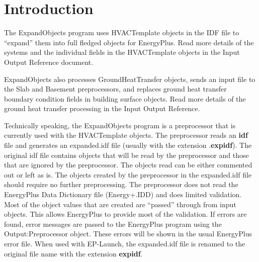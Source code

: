 \section{Introduction}\label{introduction-001}

The ExpandObjects program uses HVACTemplate objects in the IDF file to ``expand'' them into full fledged objects for EnergyPlus. Read more details of the systems and the individual fields in the HVACTemplate objects in the Input Output Reference document.

ExpandObjects also processes GroundHeatTransfer objects, sends an input file to the Slab and Basement preprocessors, and replaces ground heat transfer boundary condition fields in building surface objects. Read more details of the ground heat transfer processing in the Input Output Reference.

Technically speaking, the ExpandObjects program is a preprocessor that is currently used with the HVACTemplate objects. The preprocessor reads an \textbf{idf} file and generates an expanded.idf file (usually with the extension .\textbf{expidf}). The original idf file contains objects that will be read by the preprocessor and those that are ignored by the preprocessor. The objects read can be either commented out or left as is. The objects created by the preprocessor in the expanded.idf file should require no further preprocessing. The preprocessor does not read the EnergyPlus Data Dictionary file (Energy+.IDD) and does limited validation. Most of the object values that are created are ``passed'' through from input objects. This allows EnergyPlus to provide most of the validation. If errors are found, error messages are passed to the EnergyPlus program using the Output:Preprocessor object. These errors will be shown in the usual EnergyPlus error file. When used with EP-Launch, the expanded.idf file is renamed to the original file name with the extension \textbf{expidf}.
